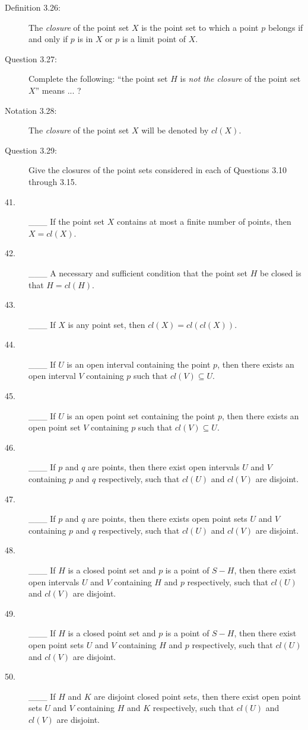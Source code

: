 \documentclass{book}
\begin{document}
\begin{description}
\item[Definition 3.26:] The \emph{closure} of the point set $X$ is the point set to which a point $p$ belongs if and only if $p$ is in $X$ or $p$ is a limit point of $X$.

\item[Question 3.27:] Complete the following: ``the point set $H$ is \emph{not the closure} of the point set $X$'' means ... ?

\item[Notation 3.28:] The \emph{closure} of the point set $X$ will be denoted by $cl(X)$.

\item[Question 3.29:] Give the closures of the point sets considered in each of Questions 3.10 through 3.15.

\item[41.] \_\_\_ If the point set $X$ contains at most a finite number of points, then $X = cl(X)$.

\item[42.] \_\_\_ A necessary and sufficient condition that the point set $H$ be closed is that $H = cl(H)$.

\item[43.] \_\_\_ If $X$ is any point set, then $cl(X) = cl(cl(X))$.

\item[44.] \_\_\_ If $U$ is an open interval containing the point $p$, then there exists an open interval $V$ containing $p$ such that $cl(V) \subseteq U$.

\item[45.] \_\_\_ If $U$ is an open point set containing the point $p$, then there exists an open point set $V$ containing $p$ such that $cl(V) \subseteq U$.

\item[46.] \_\_\_ If $p$ and $q$ are points, then there exist open intervals $U$ and $V$ containing $p$ and $q$ respectively, such that $cl(U)$ and $cl(V)$ are disjoint.

\item[47.] \_\_\_ If $p$ and $q$ are points, then there exists open point sets $U$ and $V$ containing $p$ and $q$ respectively, such that $cl(U)$ and $cl(V)$ are disjoint.

\item[48.] \_\_\_ If $H$ is a closed point set and $p$ is a point of $S - H$, then there exist open intervals $U$ and $V$ containing $H$ and $p$ respectively, such that $cl(U)$ and $cl(V)$ are disjoint.

\item[49.] \_\_\_ If $H$ is a closed point set and $p$ is a point of $S - H$, then there exist open point sets $U$ and $V$ containing $H$ and $p$ respectively, such that $cl(U)$ and $cl(V)$ are disjoint.

\item[50.] \_\_\_ If $H$ and $K$ are disjoint closed point sets, then there exist open point sets $U$ and $V$ containing $H$ and $K$ respectively, such that $cl(U)$ and $cl(V)$ are disjoint.

\end{description}
\end{document}
